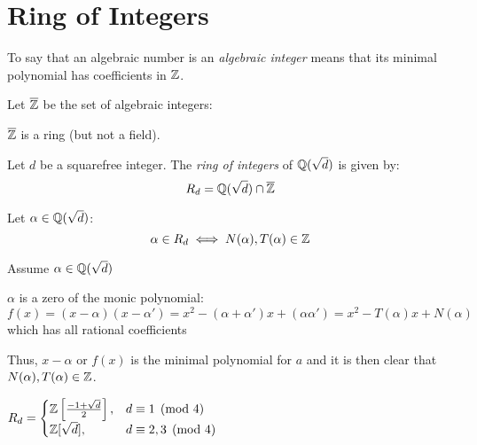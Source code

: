 \documentclass[letterpaper,12pt,fleqn]{article}
\newcommand{\Zb}{\overline{\Z}}
\newcommand{\sd}{\sqrt{d}}
\newcommand{\Qd}{\Q(\sd)}
\newcommand{\Zd}{\Z[\sd]}
\newcommand{\w}{\frac{-1+\sd}{2}}
\newcommand{\Zw}{\Z\left[\w\right]}
\renewcommand{\a}{\alpha}
\begin{document}
\section*{Ring of Integers}

\begin{definition}
  To say that an algebraic number is an \emph{algebraic integer} means that
  its minimal polynomial has coefficients in $\mathbb{Z}$.
\end{definition}

\begin{theorem}
  Let $\Zb$ be the set of algebraic integers:

  $\Zb$ is a ring (but not a field).
\end{theorem}

\begin{definition}
  Let $d$ be a squarefree integer. The \emph{ring of integers} of $\Qd$ is
  given by:
  \[R_d=\Qd\cap\Zb\]
\end{definition}

\begin{theorem}
  Let $\a\in\Qd$:
  \[\a\in R_d\iff N(\a),T(\a)\in\Z\]
\end{theorem}

\begin{theproof}
  Assume $\a\in\Qd$

  $\a$ is a zero of the monic polynomial:
  \[f(x)=(x-\a)(x-\a')=x^2-(\a+\a')x+(\a\a')=x^2-T(\a)x+N(\a)\]
  which has all rational coefficients
    
  Thus, $x-\a$ or $f(x)$ is the minimal polynomial for $a$ and it is then
  clear that $N(\a),T(\a)\in\Z$.
\end{theproof}

\begin{theorem}
  $R_d=\begin{cases} \Zw, & d\equiv 1\pmod 4 \\ \Zd, & d\equiv 2,3\pmod 4
  \end{cases}$
\end{theorem}
\end{document}
